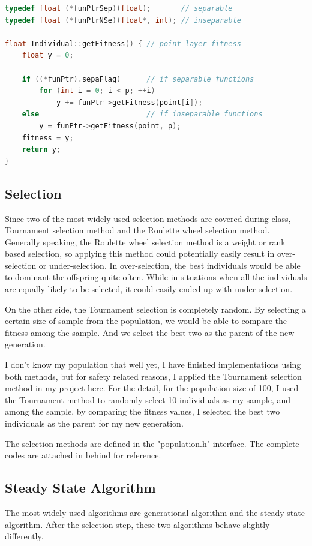 \documentclass[b5paper,11pt, abstraction, titlepage]{scrartcl}
\begin{document}
\begin{CJK}{UTF8}{gbsn}
\begin{description}
\begin{lstlisting}[language=c++]
typedef float (*funPtrSep)(float);       // separable
typedef float (*funPtrNSe)(float*, int); // inseparable

float Individual::getFitness() { // point-layer fitness
    float y = 0;
    
    if ((*funPtr).sepaFlag)      // if separable functions
        for (int i = 0; i < p; ++i) 
            y += funPtr->getFitness(point[i]);		
    else                         // if inseparable functions   
        y = funPtr->getFitness(point, p);
    fitness = y;
    return y;
}
\end{lstlisting}
\end{description}

\subsection{Selection}
Since two of the most widely used selection methods are covered during class, Tournament selection method and the Roulette wheel selection method. Generally speaking, the Roulette wheel selection method is a weight or rank based selection, so applying this method could potentially easily result in over-selection or under-selection. In over-selection, the best individuals would be able to dominant the offspring quite often. While in situations when all the individuals are equally likely to be selected, it could easily ended up with under-selection.

On the other side, the Tournament selection is completely random. By selecting a certain size of sample from the population, we would be able to compare the fitness among the sample. And we select the best two as the parent of the new generation. 

I don't know my population that well yet, I have finished implementations using both methods, but for safety related reasons, I applied the Tournament selection method in my project here. For the detail, for the population size of 100, I used the Tournament method to randomly select 10 individuals as my sample, and among the sample, by comparing the fitness values, I selected the best two individuals as the parent for my new generation. 

The selection methods are defined in the "population.h" interface. The complete codes are attached in behind for reference.

\subsection{Steady State Algorithm}
The most widely used algorithms are generational algorithm and the steady-state algorithm. After the selection step, these two algorithms behave slightly differently.


\end{CJK}
\end{document}
